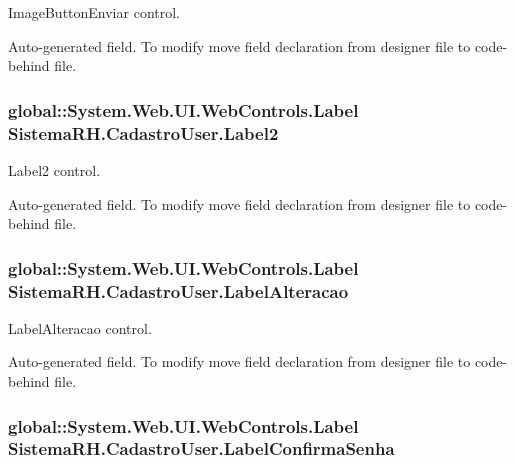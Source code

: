 ImageButtonEnviar control. 

Auto-\/generated field. To modify move field declaration from designer file to code-\/behind file. \hypertarget{class_sistema_r_h_1_1_cadastro_user_ab5f9d7756583be8406155b783f3a25cd}{
\subsubsection[{Label2}]{\setlength{\rightskip}{0pt plus 5cm}global::System.Web.UI.WebControls.Label {\bf SistemaRH.CadastroUser.Label2}}}
\label{class_sistema_r_h_1_1_cadastro_user_ab5f9d7756583be8406155b783f3a25cd}


Label2 control. 

Auto-\/generated field. To modify move field declaration from designer file to code-\/behind file. \hypertarget{class_sistema_r_h_1_1_cadastro_user_af660906708afbeb2ef5533a8cb9e3e05}{
\subsubsection[{LabelAlteracao}]{\setlength{\rightskip}{0pt plus 5cm}global::System.Web.UI.WebControls.Label {\bf SistemaRH.CadastroUser.LabelAlteracao}}}
\label{class_sistema_r_h_1_1_cadastro_user_af660906708afbeb2ef5533a8cb9e3e05}


LabelAlteracao control. 

Auto-\/generated field. To modify move field declaration from designer file to code-\/behind file. \hypertarget{class_sistema_r_h_1_1_cadastro_user_a126707960e75632de045def06f799c54}{
\subsubsection[{LabelConfirmaSenha}]{\setlength{\rightskip}{0pt plus 5cm}global::System.Web.UI.WebControls.Label {\bf SistemaRH.CadastroUser.LabelConfirmaSenha}}}
\label{class_sistema_r_h_1_1_cadastro_user_a126707960e75632de045def06f799c54}


